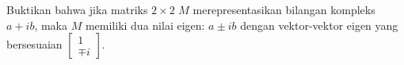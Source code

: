 
\begin{exercise}
Buktikan bahwa jika matriks $2 \times 2$ $M$ merepresentasikan bilangan
kompleks $a+ib$, maka $M$ memiliki dua nilai eigen: $a \pm i b$ dengan
vektor-vektor eigen yang bersesuaian
$\left[ \begin{smallmatrix} 1 \\ \mp i \end{smallmatrix}
\right]$.
\end{exercise}
